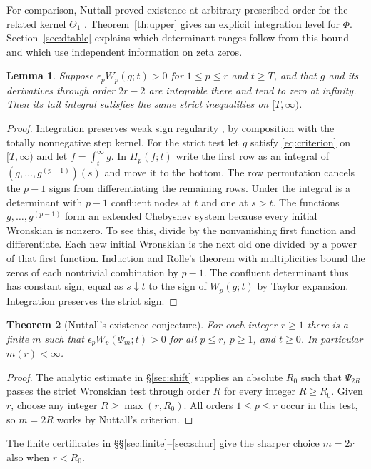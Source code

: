 \documentclass[11pt,a4paper,reqno]{amsart}
\newtheorem{theorem}{Theorem}[section]
\newtheorem{lemma}[theorem]{Lemma}
\numberwithin{equation}{section}
\begin{document}
For comparison, Nuttall proved existence at arbitrary prescribed order for the related kernel \(\Theta_1\) \cite{thetaone}. Theorem~\ref{th:upper} gives an explicit integration level for \(\Phi\). Section~\ref{sec:dtable} explains which determinant ranges follow from this bound and which use independent information on zeta zeros.

\begin{lemma}\label{lem:persist}
Suppose \(\epsilon_p W_p(g;t)>0\) for \(1\le p\le r\) and \(t\ge T\), and that \(g\) and its derivatives through order \(2r-2\) are integrable there and tend to zero at infinity. Then its tail integral satisfies the same strict inequalities on \([T,\infty)\).
\end{lemma}


\begin{proof}
Integration preserves weak sign regularity \cite[Remark 4.1]{nuttall}, by composition with the totally nonnegative step kernel. For the strict test let \(g\) satisfy \eqref{eq:criterion} on \([T,\infty)\) and let \(f=\int_t^\infty g\). In \(H_p(f;t)\) write the first row as an integral of \((g,\ldots,g^{(p-1)})(s)\) and move it to the bottom. The row permutation cancels the \(p-1\) signs from differentiating the remaining rows. Under the integral is a determinant with \(p-1\) confluent nodes at \(t\) and one at \(s>t\). The functions \(g,\ldots,g^{(p-1)}\) form an extended Chebyshev system because every initial Wronskian is nonzero. To see this, divide by the nonvanishing first function and differentiate. Each new initial Wronskian is the next old one divided by a power of that first function. Induction and Rolle's theorem with multiplicities bound the zeros of each nontrivial combination by \(p-1\). The confluent determinant thus has constant sign, equal as \(s\downarrow t\) to the sign of \(W_p(g;t)\) by Taylor expansion. Integration preserves the strict sign.
\end{proof}


\begin{theorem}[Nuttall's existence conjecture]\label{th:existence}
For each integer \(r\ge1\) there is a finite \(m\) such that \(\epsilon_pW_p(\Psi_m;t)>0\) for all \(p\le r\), \(p\ge1\), and \(t\ge0\). In particular \(m(r)<\infty\).
\end{theorem}
\begin{proof}
The analytic estimate in \S\ref{sec:shift} supplies an absolute \(R_0\) such that \(\Psi_{2R}\) passes the strict Wronskian test through order \(R\) for every integer \(R\ge R_0\). Given \(r\), choose any integer \(R\ge\max(r,R_0)\). All orders \(1\le p\le r\) occur in this test, so \(m=2R\) works by Nuttall's criterion.
\end{proof}
The finite certificates in \S\S\ref{sec:finite}--\ref{sec:schur} give the sharper choice \(m=2r\) also when \(r<R_0\).
\end{document}
